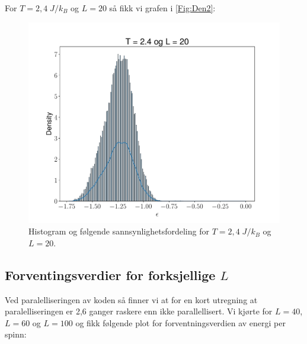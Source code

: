 \documentclass[reprint,english,notitlepage]{revtex4-2}  %
\begin{document}
For $ T = 2,4 \; J/k_B$ og $L = 20$ så fikk vi grafen i \autoref{Fig:Den2}:

\begin{figure}[H]
\centering
\includegraphics[scale=0.4, trim=2.5cm 0 0 0]{../Images/T240L20.pdf}
\caption{Histogram og følgende sannsynlighetsfordeling for $T = 2,4 \; J/k_B$ og $L = 20$.}
\label{Den2}
\end{figure}

\subsection*{Forventingsverdier for forksjellige $L$}

Ved paralelliseringen av koden så finner vi at for en kort utregning at paralelliseringen er 2,6 ganger raskere enn ikke parallellisert. Vi kjørte for $L = 40$, $L = 60$ og $L = 100$ og fikk følgende plot for forventningsverdien av energi per spinn:
\end{document}
